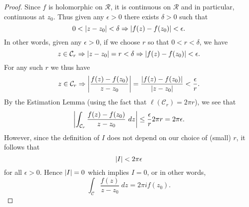 \begin{proof}
Since $f$ is holomorphic on $\mathcal{R}$, it is continuous on $\mathcal{R}$ and in particular, continuous at $z_0$.  Thus given any $\epsilon>0$ there exists $\delta>0$ such that
\[
0 < \left| z-z_0 \right| < \delta \Rightarrow \left|  f(z)-f(z_0)  \right| < \epsilon.
\]
In other words, given any $\epsilon >0$, if we choose $r$ so that $0<r < \delta$, we have
\[
z \in \mathcal{C}_r \Rightarrow \left| z-z_0 \right| = r < \delta \Rightarrow \left| f(z)-f(z_0) \right| < \epsilon.
\]
For any such $r$ we thus have
\[
z \in \mathcal{C}_r \Rightarrow \left| \frac{f(z)-f(z_0)}{z-z_0} \right| = \frac{\left| f(z)-f(z_0) \right|}{\left| z-z_0 \right|} < \frac{\epsilon}{r}.
\]
By the Estimation Lemma (using the fact that $\ell ( \mathcal{C}_r ) = 2 \pi r$), we see that
\[
\left| \int_{\mathcal{C}_r} \frac{f(z)-f(z_0)}{z-z_0}\ dz \right| \leq \frac{\epsilon}{r} 2 \pi r = 2\pi \epsilon.
\]
However, since the definition of $I$ does not depend on our choice of (small) $r$, it follows that
\[
\left| I \right| < 2 \pi \epsilon
\]
for all $\epsilon>0$.  Hence $\left| I \right|=0$ which implies $I=0$, or in other words,
\[
\int_{\mathcal{C}} \frac{f(z)}{z-z_0}\ dz = 2 \pi i f(z_0).
\]
\end{proof}


